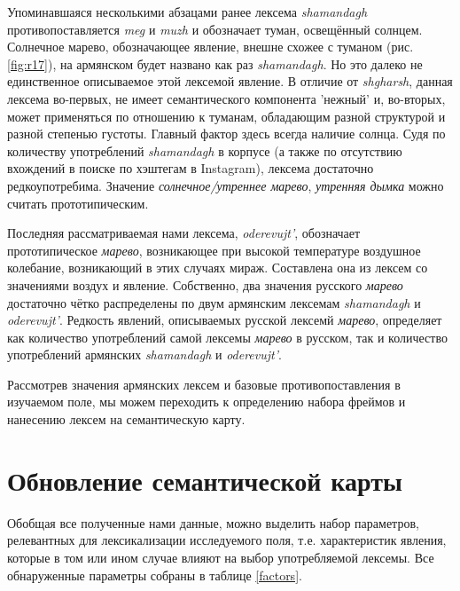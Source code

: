 \par Упоминавшаяся несколькими абзацами ранее лексема \textit{shamandagh} противопоставляется \textit{meg} и \textit{muzh} и обозначает туман, освещённый солнцем. Солнечное марево, обозначающее явление, внешне схожее с туманом (рис. \ref{fig:r17}), на армянском будет названо как раз \textit{shamandagh}. Но это далеко не единственное описываемое этой лексемой явление. В отличие от \textit{shgharsh}, данная лексема во-первых, не имеет семантического компонента 'нежный' и, во-вторых, может применяться по отношению к туманам, обладающим разной структурой и разной степенью густоты. Главный фактор здесь всегда наличие солнца. Судя по количеству употреблений \textit{shamandagh} в корпусе (а также по отсутствию вхождений в поиске по хэштегам в Instagram), лексема достаточно редкоупотребима. Значение \textit{солнечное/утреннее марево}, \textit{утренняя дымка} можно считать прототипическим.

\par Последняя рассматриваемая нами лексема, \textit{oderevujt’}, обозначает прототипическое \textit{марево}, возникающее при высокой температуре воздушное колебание, возникающий в этих случаях мираж. Составлена она из лексем со значениями воздух и явление. Собственно, два значения русского \textit{марево} достаточно чётко распределены по двум армянским лексемам \textit{shamandagh} и \textit{oderevujt’}. Редкость явлений, описываемых русской лексемй \textit{марево}, определяет как количество употреблений самой лексемы \textit{марево} в русском, так и количество употреблений армянских \textit{shamandagh} и \textit{oderevujt’}.

\par Рассмотрев значения армянских лексем и базовые противопоставления в изучаемом поле, мы можем переходить к определению набора фреймов и нанесению лексем на семантическую карту.

\section{Обновление семантической карты} \label{semap}

\par Обобщая все полученные нами данные, можно выделить набор параметров, релевантных для лексикализации исследуемого поля, т.е. характеристик явления, которые в том или ином случае влияют на выбор употребляемой лексемы. Все обнаруженные параметры собраны в таблице \ref{factors}.

